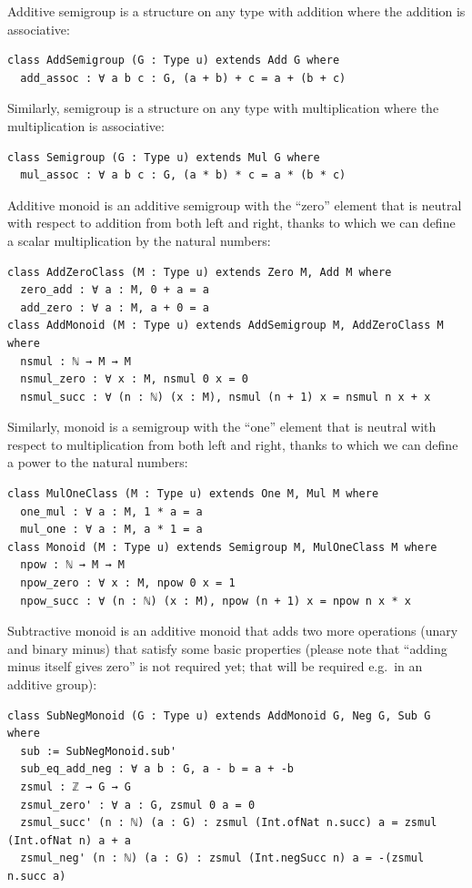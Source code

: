 \documentclass[]{article}
\renewcommand{\.}{\hskip .75pt}
\begin{document}
Additive semigroup is a structure on any type with addition where the addition is associative:
\begin{lstlisting}
class AddSemigroup (G : Type u) extends Add G where
  add_assoc : ∀ a b c : G, (a + b) + c = a + (b + c)
\end{lstlisting}
Similarly, semigroup is a structure on any type with multiplication where the multiplication is associative:
\begin{lstlisting}
class Semigroup (G : Type u) extends Mul G where
  mul_assoc : ∀ a b c : G, (a * b) * c = a * (b * c)
\end{lstlisting}
Additive monoid is an additive semigroup with the ``zero'' element that is neutral with respect to addition
from both left and right, thanks to which we can define a scalar multiplication by the natural numbers:
\begin{lstlisting}
class AddZeroClass (M : Type u) extends Zero M, Add M where
  zero_add : ∀ a : M, 0 + a = a
  add_zero : ∀ a : M, a + 0 = a
class AddMonoid (M : Type u) extends AddSemigroup M, AddZeroClass M where
  nsmul : ℕ → M → M
  nsmul_zero : ∀ x : M, nsmul 0 x = 0 
  nsmul_succ : ∀ (n : ℕ) (x : M), nsmul (n + 1) x = nsmul n x + x 
\end{lstlisting}
Similarly, monoid is a semigroup with the ``one'' element that is neutral with respect to multiplication
from both left and right, thanks to which we can define a power to the natural numbers:
\begin{lstlisting}
class MulOneClass (M : Type u) extends One M, Mul M where
  one_mul : ∀ a : M, 1 * a = a
  mul_one : ∀ a : M, a * 1 = a
class Monoid (M : Type u) extends Semigroup M, MulOneClass M where
  npow : ℕ → M → M 
  npow_zero : ∀ x : M, npow 0 x = 1 
  npow_succ : ∀ (n : ℕ) (x : M), npow (n + 1) x = npow n x * x 
\end{lstlisting}
Subtractive monoid is an additive monoid that adds two more operations (unary and binary minus)
that satisfy some basic properties (please note that ``adding minus itself gives zero''
is not required yet; that will be required e.g.~in an additive group):
\begin{lstlisting}
class SubNegMonoid (G : Type u) extends AddMonoid G, Neg G, Sub G where
  sub := SubNegMonoid.sub'
  sub_eq_add_neg : ∀ a b : G, a - b = a + -b 
  zsmul : ℤ → G → G
  zsmul_zero' : ∀ a : G, zsmul 0 a = 0 
  zsmul_succ' (n : ℕ) (a : G) : zsmul (Int.ofNat n.succ) a = zsmul (Int.ofNat n) a + a
  zsmul_neg' (n : ℕ) (a : G) : zsmul (Int.negSucc n) a = -(zsmul n.succ a)
\end{lstlisting}
\end{document}
